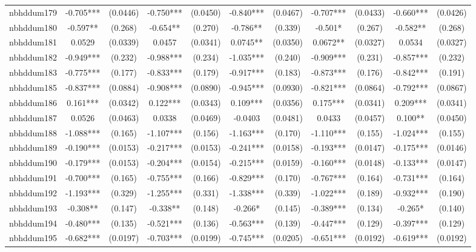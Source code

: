 \documentclass[]{article}
\begin{document}
\begin{tabular}{lcccccccccc}
nbhddum179 & -0.705*** & (0.0446) & -0.750*** & (0.0450) & -0.840*** & (0.0467) & -0.707*** & (0.0433) & -0.660*** & (0.0426) \\
nbhddum180 & -0.597** & (0.268) & -0.654** & (0.270) & -0.786** & (0.339) & -0.501* & (0.267) & -0.582** & (0.268) \\
nbhddum181 & 0.0529 & (0.0339) & 0.0457 & (0.0341) & 0.0745** & (0.0350) & 0.0672** & (0.0327) & 0.0534 & (0.0327) \\
nbhddum182 & -0.949*** & (0.232) & -0.988*** & (0.234) & -1.035*** & (0.240) & -0.909*** & (0.231) & -0.857*** & (0.232) \\
nbhddum183 & -0.775*** & (0.177) & -0.833*** & (0.179) & -0.917*** & (0.183) & -0.873*** & (0.176) & -0.842*** & (0.191) \\
nbhddum185 & -0.837*** & (0.0884) & -0.908*** & (0.0890) & -0.945*** & (0.0930) & -0.821*** & (0.0864) & -0.792*** & (0.0867) \\
nbhddum186 & 0.161*** & (0.0342) & 0.122*** & (0.0343) & 0.109*** & (0.0356) & 0.175*** & (0.0341) & 0.209*** & (0.0341) \\
nbhddum187 & 0.0526 & (0.0463) & 0.0338 & (0.0469) & -0.0403 & (0.0481) & 0.0433 & (0.0457) & 0.100** & (0.0450) \\
nbhddum188 & -1.088*** & (0.165) & -1.107*** & (0.156) & -1.163*** & (0.170) & -1.110*** & (0.155) & -1.024*** & (0.155) \\
nbhddum189 & -0.190*** & (0.0153) & -0.217*** & (0.0153) & -0.241*** & (0.0158) & -0.193*** & (0.0147) & -0.175*** & (0.0146) \\
nbhddum190 & -0.179*** & (0.0153) & -0.204*** & (0.0154) & -0.215*** & (0.0159) & -0.160*** & (0.0148) & -0.133*** & (0.0147) \\
nbhddum191 & -0.700*** & (0.165) & -0.755*** & (0.166) & -0.829*** & (0.170) & -0.767*** & (0.164) & -0.731*** & (0.164) \\
nbhddum192 & -1.193*** & (0.329) & -1.255*** & (0.331) & -1.338*** & (0.339) & -1.022*** & (0.189) & -0.932*** & (0.190) \\
nbhddum193 & -0.308** & (0.147) & -0.338** & (0.148) & -0.266* & (0.145) & -0.389*** & (0.134) & -0.265* & (0.140) \\
nbhddum194 & -0.480*** & (0.135) & -0.521*** & (0.136) & -0.563*** & (0.139) & -0.447*** & (0.129) & -0.397*** & (0.129) \\
nbhddum195 & -0.682*** & (0.0197) & -0.703*** & (0.0199) & -0.745*** & (0.0205) & -0.651*** & (0.0192) & -0.619*** & (0.0192) \\

\end{tabular}
\end{document}
